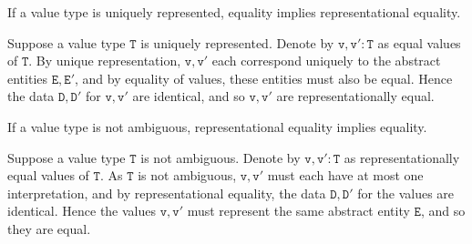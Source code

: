 \begin{Lemma}
    If a value type is uniquely represented, equality implies representational equality.
\end{Lemma}

\begin{solution}
    Suppose a value type $\mathtt{T}$ is uniquely represented. Denote by $\mathtt{v},
    \mathtt{v'} : \mathtt{T}$ as equal values of $\mathtt{T}$. By unique representation, 
    $\mathtt{v}, \mathtt{v'}$ each correspond uniquely to the abstract entities $\mathtt{E}, 
    \mathtt{E'}$, and by equality of values, these entities must also be equal. 
    Hence the data $\mathtt{D}, \mathtt{D'}$ for $\mathtt{v}, \mathtt{v'}$ are 
    identical, and so $\mathtt{v}, \mathtt{v'}$ are representationally equal.
\end{solution}

\begin{Lemma}
    If a value type is not ambiguous, representational equality implies equality.
\end{Lemma}

\begin{solution}
    Suppose a value type $\mathtt{T}$ is not ambiguous. Denote by $\mathtt{v}, \mathtt{v'} : 
    \mathtt{T}$ as representationally equal values of $\mathtt{T}$. As $\mathtt{T}$ is not 
    ambiguous, $\mathtt{v}, \mathtt{v'}$ must each have at most one interpretation, and 
    by representational equality, the data $\mathtt{D}, \mathtt{D'}$ for the values are 
    identical. Hence the values $\mathtt{v}, \mathtt{v'}$ must represent the same abstract 
    entity $\mathtt{E}$, and so they are equal.
\end{solution}